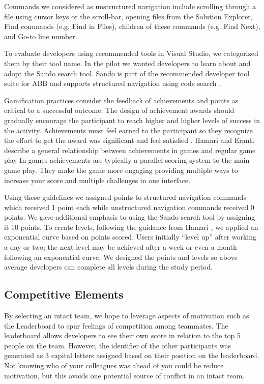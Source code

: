 \documentclass{sig-alternate}
\begin{document}
Commands we considered as unstructured navigation include scrolling through a file using cursor keys or the scroll-bar, opening files from the Solution Explorer, Find commands (e.g. Find in Files), children of these commands (e.g. Find Next), and Go-to line number.

To evaluate developers using recommended tools in Visual Studio, we categorized them by their tool name.  In the pilot we wanted developers to learn about and adopt the Sando search tool.  Sando is part of the recommended developer tool suite for ABB and supports structured navigation using code search \cite{Shepherd2012Sando}.

Gamification practices consider the feedback of achievements and points as critical to a successful outcome.  The design of achievement awards should gradually encourage the participant to reach higher and higher levels of success in the activity.  Achievements must feel earned to the participant so they recognize the effort to get the award was significant and feel satisfied  \cite{wbsnipes:Hamari2011Framework}.  Hamari and Eranti describe a general relationship between achievements in games and regular game play      In games achievements are typically a parallel scoring system to the main game play.  They make the game more engaging providing multiple ways to increase your score and multiple challenges in one interface.

Using these guidelines we assigned points to structured navigation commands which received 1 point each while unstructured navigation commands received 0 points.    We gave additional emphasis to using the Sando search tool by assigning it 10 points.  To create levels, following the guidance from Hamari \cite{wbsnipes:Hamari2011Framework}, we applied an exponential curve based on points scored.  Users initially ``level up'' after  working a day or two; the next level may be achieved after a week or even a month following an exponential curve.  We designed the points and levels so above average developers can complete all levels during the study period.

\subsection{Competitive Elements}

By selecting an intact team, we hope to leverage aspects of motivation such as the Leaderboard to spur feelings of competition among teammates.    The leaderboard allows developers to see their own score in relation to the top 5 people on the team.  However, the identifier of the other participants was generated as 3 capital letters assigned based on their position on the leaderboard.  Not knowing who of your colleagues was ahead of you could be  reduce motivation, but this avoids one potential source of conflict in an intact team.
\end{document}
